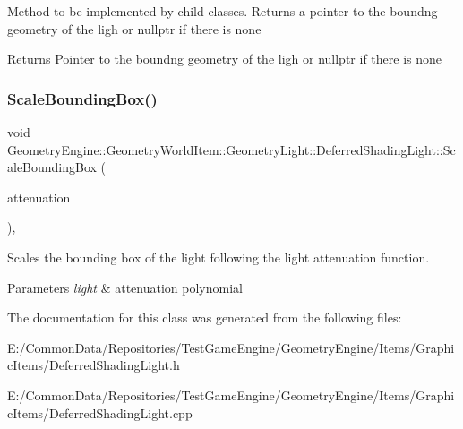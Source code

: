 Method to be implemented by child classes. Returns a pointer to the boundng geometry of the ligh or nullptr if there is none \begin{DoxyReturn}{Returns}
Pointer to the boundng geometry of the ligh or nullptr if there is none 
\end{DoxyReturn}
\mbox{\label{class_geometry_engine_1_1_geometry_world_item_1_1_geometry_light_1_1_deferred_shading_light_afeb4ce0c059042c837cc853701811be9}} 
\subsubsection{\texorpdfstring{ScaleBoundingBox()}{ScaleBoundingBox()}}
{\footnotesize\ttfamily void Geometry\+Engine\+::\+Geometry\+World\+Item\+::\+Geometry\+Light\+::\+Deferred\+Shading\+Light\+::\+Scale\+Bounding\+Box (\begin{DoxyParamCaption}\item[{const Q\+Vector3D \&}]{attenuation }\end{DoxyParamCaption})\hspace{0.3cm}{\ttfamily [protected]}, {\ttfamily [virtual]}}

Scales the bounding box of the light following the light attenuation function. 
\begin{DoxyParams}{Parameters}
{\em light} & attenuation polynomial \\
\hline
\end{DoxyParams}


The documentation for this class was generated from the following files\+:\begin{DoxyCompactItemize}
\item 
E\+:/\+Common\+Data/\+Repositories/\+Test\+Game\+Engine/\+Geometry\+Engine/\+Items/\+Graphic\+Items/Deferred\+Shading\+Light.\+h\item 
E\+:/\+Common\+Data/\+Repositories/\+Test\+Game\+Engine/\+Geometry\+Engine/\+Items/\+Graphic\+Items/Deferred\+Shading\+Light.\+cpp\end{DoxyCompactItemize}
